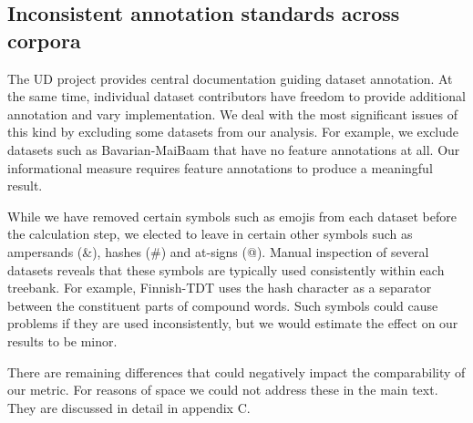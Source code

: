 \documentclass[USenglish]{article}
\begin{document}
\subsection{Inconsistent annotation standards across corpora}

The UD project provides central documentation guiding dataset annotation.
At the same time, individual dataset contributors have freedom to provide additional annotation and vary implementation.
We deal with the most significant issues of this kind by excluding some datasets from our analysis.
For example, we exclude datasets such as Bavarian-MaiBaam that have no feature annotations at all. 
Our informational measure requires feature annotations to produce a meaningful result.

While we have removed certain symbols such as emojis from each dataset before the calculation step, we elected to leave in certain other symbols such as ampersands (\&), hashes (\#) and at-signs (@).
Manual inspection of several datasets reveals that these symbols are typically used consistently within each treebank.
For example, Finnish-TDT uses the hash character as a separator between the constituent parts of compound words.
Such symbols could cause problems if they are used inconsistently, but we would estimate the effect on our results to be minor.

There are remaining differences that could negatively impact the comparability of our metric.
For reasons of space we could not address these in the main text.
They are discussed in detail in appendix C.

\FloatBarrier
\end{document}
